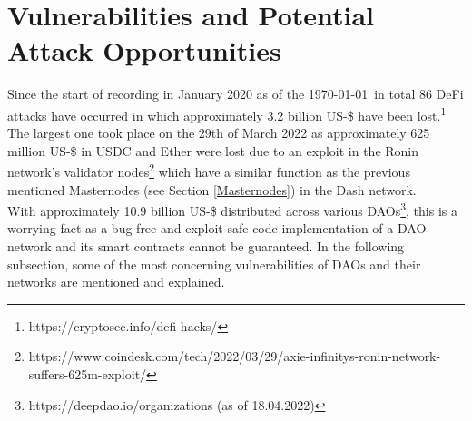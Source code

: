 \documentclass[a4paper,12pt]{report}
\begin{document}
	\section{Vulnerabilities and Potential Attack Opportunities} \label{VPAO} 
	\startsection
	    Since the start of recording in January 2020 as of the \today \ in total 86 DeFi attacks have occurred in which approximately 3.2 billion US-\$ have been lost.\footnote{\hspace{0.5em}https://cryptosec.info/defi-hacks/} The largest one took place on the 29th of March 2022 as approximately 625 million US-\$ in USDC and Ether were lost due to an exploit in the Ronin network's validator nodes\footnote{\hspace{0.5em}https://www.coindesk.com/tech/2022/03/29/axie-infinitys-ronin-network-suffers-625m-exploit/} which have a similar function as the previous mentioned Masternodes (see Section \ref{Masternodes}) in the Dash network. \\
	    With approximately 10.9 billion US-\$ distributed across various DAOs\footnote{\hspace{0.5em}https://deepdao.io/organizations (as of 18.04.2022)}, this is a worrying fact as a bug-free and exploit-safe code implementation of a DAO network and its smart contracts cannot be guaranteed. In the following subsection, some of the most concerning vulnerabilities of DAOs and their networks are mentioned and explained.
\end{document}
